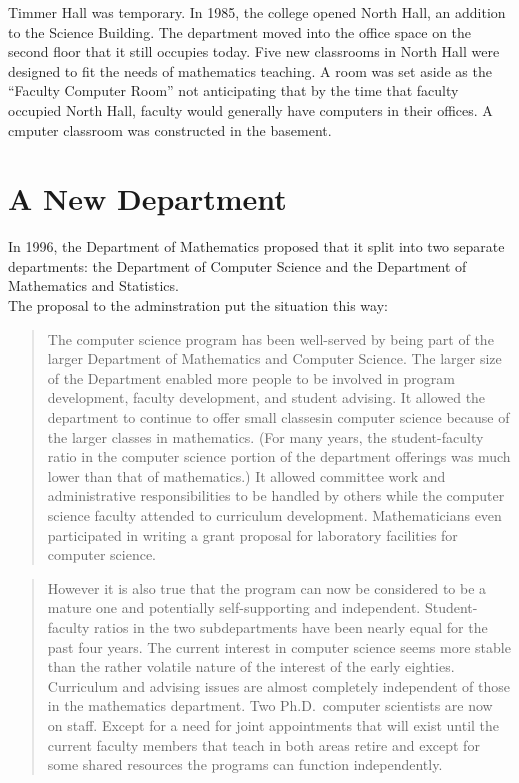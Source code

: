 \documentclass[
]{book}
\begin{document}
Timmer Hall was temporary. In 1985, the college opened North Hall, an addition to the Science Building. The department moved into the office space on the second floor that it still occupies today. Five new classrooms in North Hall were designed to fit the needs of mathematics teaching. A room was set aside as the ``Faculty Computer Room'' not anticipating that by the time that faculty occupied North Hall, faculty would generally have computers in their offices. A cmputer classroom was constructed in the basement.

\hypertarget{a-new-department}{%
\section{A New Department}\label{a-new-department}}

In 1996, the Department of Mathematics proposed that it split into two separate departments: the Department of Computer Science and the Department of Mathematics and Statistics.\\
The proposal to the adminstration put the situation this way:

\begin{quote}
The computer science program has been well-served by being part of the larger Department of Mathematics and Computer Science. The larger size of the Department enabled more people to be involved in program development, faculty development, and student advising. It allowed the department to continue to offer small classesin computer science because of the larger classes in mathematics. (For many years, the student-faculty ratio in the computer science portion of the department offerings was much lower than that of mathematics.) It allowed committee work and administrative responsibilities to be handled by others while the computer science faculty attended to curriculum development. Mathematicians even participated in writing a grant proposal for laboratory facilities for computer science.
\end{quote}

\begin{quote}
However it is also true that the program can now be considered to be a mature one and potentially self-supporting and independent. Student-faculty ratios in the two subdepartments have been nearly equal for the past four years. The current interest in computer science seems more stable than the rather volatile nature
of the interest of the early eighties. Curriculum and advising issues are almost completely independent of those in the mathematics department. Two Ph.D.~computer scientists are now on staff. Except for a need for joint appointments that will exist until the current faculty members that teach in both areas retire and except for some shared resources the
programs can function independently.
\end{quote}
\end{document}
